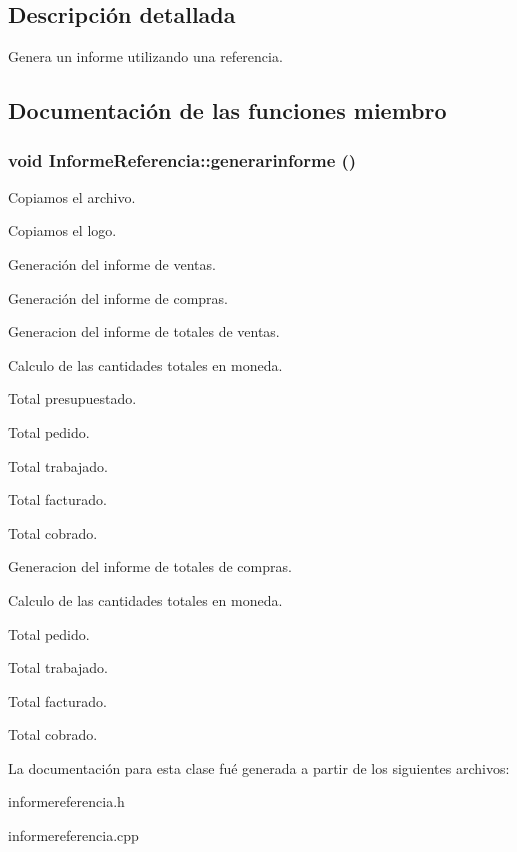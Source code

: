 \subsection{Descripci\'{o}n detallada}
Genera un informe utilizando una referencia. 



\subsection{Documentaci\'{o}n de las funciones miembro}
\subsubsection{\setlength{\rightskip}{0pt plus 5cm}void Informe\-Referencia::generarinforme ()}\label{classInformeReferencia_a0}


Copiamos el archivo.

Copiamos el logo.

Generaci\'{o}n del informe de ventas.

Generaci\'{o}n del informe de compras.

Generacion del informe de totales de ventas.

Calculo de las cantidades totales en moneda.

Total presupuestado.

Total pedido.

Total trabajado.

Total facturado.

Total cobrado.

Generacion del informe de totales de compras.

Calculo de las cantidades totales en moneda.

Total pedido.

Total trabajado.

Total facturado.

Total cobrado. 

La documentaci\'{o}n para esta clase fu\'{e} generada a partir de los siguientes archivos:\begin{CompactItemize}
\item 
informereferencia.h\item 
informereferencia.cpp\end{CompactItemize}
